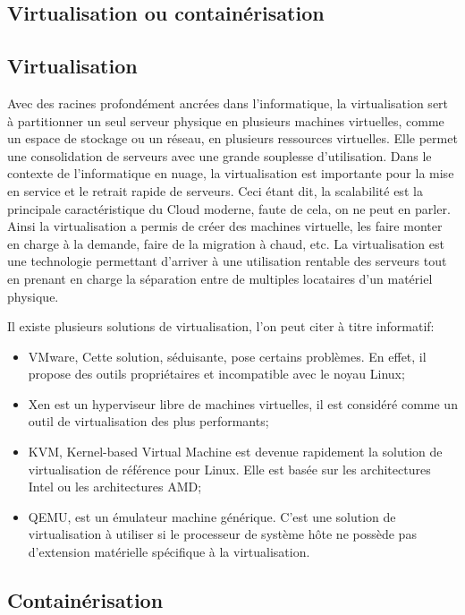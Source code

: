 \begin{onehalfspace}
\section{Virtualisation ou containérisation}

\subsection{Virtualisation}

Avec des racines profondément ancrées dans l'informatique, la virtualisation sert à partitionner un seul serveur physique en plusieurs machines virtuelles, comme un espace de stockage ou un réseau, en plusieurs ressources virtuelles. Elle permet une consolidation de serveurs avec une grande souplesse d'utilisation. Dans le contexte de l'informatique en nuage, la virtualisation est importante pour la mise en service et le retrait rapide de serveurs. Ceci étant dit, la scalabilité est la principale caractéristique du Cloud moderne, faute de cela, on ne peut en parler. Ainsi la virtualisation a permis de créer des machines virtuelle, les faire monter en charge à la demande, faire de la migration à chaud, etc. La virtualisation est une technologie permettant d'arriver à une utilisation rentable des serveurs tout en prenant en charge la séparation entre de multiples locataires d'un matériel physique.

Il existe plusieurs solutions de virtualisation, l'on peut citer à titre informatif:

\begin{itemize}
\item VMware, Cette solution, séduisante, pose certains problèmes. En effet, il propose des outils propriétaires et incompatible avec le noyau Linux;
\item Xen est un hyperviseur libre de machines virtuelles, il est considéré comme un outil de virtualisation des plus performants;
\item KVM, Kernel-based Virtual Machine est devenue rapidement la solution de virtualisation de référence pour Linux. Elle est basée sur les architectures Intel ou les architectures AMD;
\item QEMU, est un émulateur machine générique. C'est une solution de virtualisation à utiliser si le processeur de système hôte ne possède pas d'extension matérielle spécifique à la virtualisation.

\end{itemize}

\subsection{Containérisation}


\end{onehalfspace}
